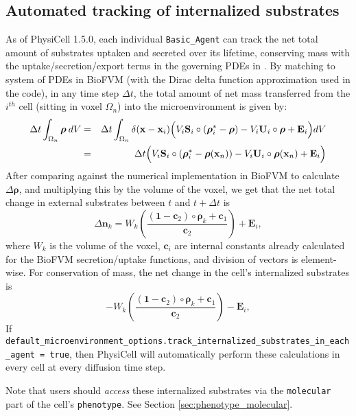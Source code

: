 \documentclass[12pt]{article}
\renewcommand{\vec}[1]{\mathbf{#1}}
\newcommand{\beq}{\begin{equation}}
\newcommand{\eeq}{\end{equation}}
\newcommand{\beqa}{\begin{eqnarray}}
\newcommand{\eeqa}{\end{eqnarray}}
\newcommand{\grvec}[1]{\boldsymbol{#1}}
\renewcommand{\v}{\verb}
\begin{document}
\subsection{Automated tracking of internalized substrates}
\label{sec:BioFVM_internalization_tracking}
As of PhysiCell 1.5.0, each individual \v|Basic_Agent| can track the net total amount of substrates 
uptaken and secreted over its lifetime, conserving mass with the uptake/secretion/export terms in the 
governing PDEs in \cite{ref:BioFVM}.  By matching to system of PDEs in BioFVM (with the Dirac delta
function approximation used in the code), in any time step $\Delta t$, the total amount of net mass 
transferred from the $i^{th}$ cell (sitting in voxel $\Omega_n$) into the microenvironment is given by: 
\beqa
\Delta t \int_{\Omega_n} \grvec{\rho} \: dV 
& = & \Delta t \int_{\Omega_n }  \delta( \vec{x} - \vec{x}_i ) 
\Bigl( V_i \vec{S}_i \circ 
\left( \grvec{\rho}^*_i - \grvec{\rho} \right) - V_i \vec{U}_i \circ \grvec{\rho} + \vec{E}_i \Bigr) dV 
\nonumber \\
& = & 
\Delta t 
\Bigl( V_i \vec{S}_i \circ 
\left( \grvec{\rho}^*_i - \grvec{\rho}(\vec{x}_n) \right) - V_i \vec{U}_i \circ \grvec{\rho}(\vec{x}_n) + \vec{E}_i \Bigr)   
\eeqa
After comparing against the numerical implementation in BioFVM to calculate 
$\Delta \grvec{\rho}$, and multiplying this by the volume of the voxel, we get that the net 
total change in external substrates between $t$ and $t+\Delta t$ is
\beq
\Delta \vec{n}_k = W_k 
\left( \frac{(\grvec{1}-\vec{c}_2) \circ \grvec{\rho}_k + \vec{c}_1 }{ \vec{c}_2 } \right) + \vec{E}_i , 
\eeq
where $W_k$ is the volume of the voxel, $\vec{c}_i$ are internal constants already calculated for the 
BioFVM secretion/uptake functions, and division of vectors is element-wise. For conservation of mass, 
the net change in the cell's internalized substrates is 
\beq
-W_k 
\left( \frac{(\grvec{1}-\vec{c}_2) \circ \grvec{\rho}_k + \vec{c}_1 }{ \vec{c}_2 } \right) - \vec{E}_i, 
\eeq
If \v|default_microenvironment_options.track_internalized_substrates_in_each_agent = true|, then 
PhysiCell will automatically perform these calculations in every cell at every diffusion time step. 

Note that users should \emph{access} these internalized substrates via the \v|molecular| part of the 
cell's \v|phenotype|. See Section \ref{sec:phenotype_molecular}. 
\end{document}
